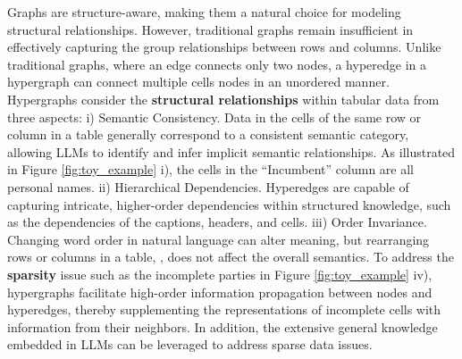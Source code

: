 Graphs are structure-aware, making them a natural choice for modeling structural relationships. However, traditional graphs remain insufficient in effectively capturing the group relationships between rows and columns. %
Unlike traditional graphs, where an edge connects only two nodes, a hyperedge in a hypergraph can connect multiple cells nodes in an unordered manner. Hypergraphs consider the \textbf{structural relationships} within tabular data from three aspects: i) Semantic Consistency. Data in the cells of the same row or column in a table generally correspond to a consistent semantic category, allowing LLMs to identify and infer implicit semantic relationships. As illustrated in Figure \ref{fig:toy_example} i), the cells in the ``Incumbent'' column are all personal names. ii) Hierarchical Dependencies. Hyperedges are capable of capturing intricate, higher-order dependencies within structured knowledge, such as the dependencies of the captions, headers, and cells. iii) Order Invariance. Changing word order in natural language can alter meaning, but rearranging rows or columns in a table, , does not affect the overall semantics. To address the \textbf{sparsity} issue such as the incomplete parties in Figure \ref{fig:toy_example} iv), hypergraphs facilitate high-order information propagation between nodes and hyperedges, thereby supplementing the representations of incomplete cells with information from their neighbors. In addition, the extensive general knowledge embedded in LLMs can be leveraged to address sparse data issues.



